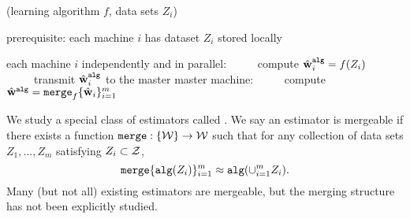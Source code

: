 \documentclass[thesis.tex]{subfiles}
\newcommand{\merge}{\mkprocedure{merge}}
\newcommand{\alg}{\mkprocedure{alg}}
\newcommand{\walg}{{\hat\w^{\alg}}}
\begin{document}
\begin{algorithm}[t]
    \caption{(learning algorithm $f$, data sets $Z_i$)}
    \label{alg:dist}
    \vspace{0.1in}
    prerequisite: each machine $i$ has dataset $Z_i$ stored locally
    \begin{algorithmic}[1]
        \State each machine $i$ independently and in parallel:
        \State ~~~~~compute $\walg_i = f(Z_i)$
        \State ~~~~~transmit $\walg_i$ to the master
        \State master machine:
        \State ~~~~~compute $\walg = \merge_f\{\what_i\}_{i=1}^m$
    \end{algorithmic}
\end{algorithm}

We study a special class of estimators called .
We say an estimator is mergeable if there exists a function $\merge : \{\W\} \to \W$ such that
for any collection of data sets $Z_1,...,Z_m$ satisfying $Z_i\subset{\mathcal Z}$,
\begin{equation}
    \label{eq:notation:merge}
    \merge\{\alg(Z_i)\}_{i=1}^m \approx \alg(\cup_{i=1}^m Z_i)
    .
\end{equation}
Many (but not all) existing estimators are mergeable,
but the merging structure has not been explicitly studied.%
\end{document}
